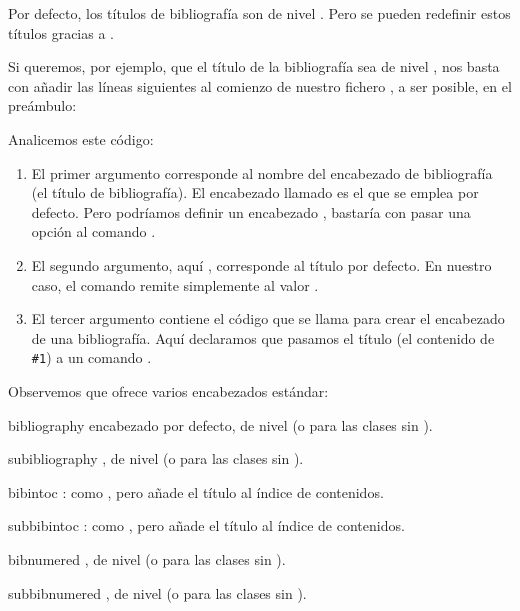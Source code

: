 Por defecto, los títulos de bibliografía son de nivel
. Pero se pueden redefinir estos
títulos gracias a .

Si queremos, por ejemplo, que el título de la bibliografía sea de
nivel , nos basta con añadir las líneas siguientes al
comienzo de nuestro fichero , a ser posible, en el preámbulo:


Analicemos este código:
\begin{enumerate}
\item El primer argumento corresponde al nombre del encabezado de
  bibliografía (el título de bibliografía). El encabezado llamado
   es el que se emplea por defecto. Pero podríamos
  definir un encabezado , bastaría con pasar una opción
   al comando .


\item El segundo argumento, aquí , corresponde al título
  por defecto. En nuestro caso, el comando  remite
  simplemente al valor .
\item El tercer argumento contiene el código que se llama para crear
  el encabezado de una bibliografía. Aquí declaramos que pasamos el título
  (el contenido de \verb|#1|) a un comando .
\end{enumerate}

Observemos que  ofrece varios encabezados estándar:
\begin{glossaire}
\item[bibliography]encabezado por defecto, de nivel  (o
   para las clases sin ).
\item[subibliography], de nivel  (o  para
  las clases sin ).
\item[bibintoc]: como , pero añade el título al
  índice de contenidos.
\item[subbibintoc]: como , pero añade el título
  al índice de contenidos.
\item[bibnumered], de nivel  (o  para las
  clases sin ).
\item[subbibnumered], de nivel  (o  para
  las clases sin ).
\end{glossaire}
 

